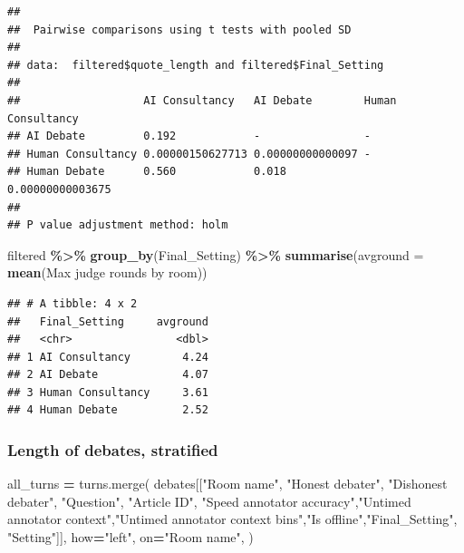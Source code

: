 \documentclass[
]{article}
\newenvironment{Shaded}{\begin{snugshade}}{\end{snugshade}}
\newcommand{\AttributeTok}[1]{\textcolor[rgb]{0.13,0.29,0.53}{#1}}
\newcommand{\FunctionTok}[1]{\textcolor[rgb]{0.13,0.29,0.53}{\textbf{#1}}}
\newcommand{\NormalTok}[1]{#1}
\newcommand{\OperatorTok}[1]{\textcolor[rgb]{0.81,0.36,0.00}{\textbf{#1}}}
\newcommand{\SpecialCharTok}[1]{\textcolor[rgb]{0.81,0.36,0.00}{\textbf{#1}}}
\newcommand{\StringTok}[1]{\textcolor[rgb]{0.31,0.60,0.02}{#1}}
\begin{document}
\begin{Shaded}
\end{Shaded}

\begin{verbatim}
## 
##  Pairwise comparisons using t tests with pooled SD 
## 
## data:  filtered$quote_length and filtered$Final_Setting 
## 
##                   AI Consultancy   AI Debate        Human Consultancy
## AI Debate         0.192            -                -                
## Human Consultancy 0.00000150627713 0.00000000000097 -                
## Human Debate      0.560            0.018            0.00000000003675 
## 
## P value adjustment method: holm
\end{verbatim}

\begin{Shaded}
\begin{Highlighting}[]
\NormalTok{filtered }\SpecialCharTok{\%\textgreater{}\%} \FunctionTok{group\_by}\NormalTok{(Final\_Setting) }\SpecialCharTok{\%\textgreater{}\%} \FunctionTok{summarise}\NormalTok{(}\AttributeTok{avground =} \FunctionTok{mean}\NormalTok{(}\StringTok{\textasciigrave{}}\AttributeTok{Max judge rounds by room}\StringTok{\textasciigrave{}}\NormalTok{))}
\end{Highlighting}
\end{Shaded}

\begin{verbatim}
## # A tibble: 4 x 2
##   Final_Setting     avground
##   <chr>                <dbl>
## 1 AI Consultancy        4.24
## 2 AI Debate             4.07
## 3 Human Consultancy     3.61
## 4 Human Debate          2.52
\end{verbatim}

\subsubsection{Length of debates,
stratified}\label{length-of-debates-stratified}

\begin{Shaded}
\begin{Highlighting}[]
\NormalTok{all\_turns }\OperatorTok{=}\NormalTok{ turns.merge(}
\NormalTok{        debates[[}\StringTok{"Room name"}\NormalTok{, }\StringTok{"Honest debater"}\NormalTok{, }\StringTok{"Dishonest debater"}\NormalTok{, }\StringTok{"Question"}\NormalTok{, }\StringTok{"Article ID"}\NormalTok{,}
                 \StringTok{"Speed annotator accuracy"}\NormalTok{,}\StringTok{"Untimed annotator context"}\NormalTok{,}\StringTok{"Untimed annotator context bins"}\NormalTok{,}\StringTok{"Is offline"}\NormalTok{,}\StringTok{"Final\_Setting"}\NormalTok{, }\StringTok{"Setting"}\NormalTok{]],}
\NormalTok{        how}\OperatorTok{=}\StringTok{"left"}\NormalTok{,}
\NormalTok{        on}\OperatorTok{=}\StringTok{"Room name"}\NormalTok{,}
\NormalTok{    )}
\end{Highlighting}
\end{Shaded}
\end{document}
